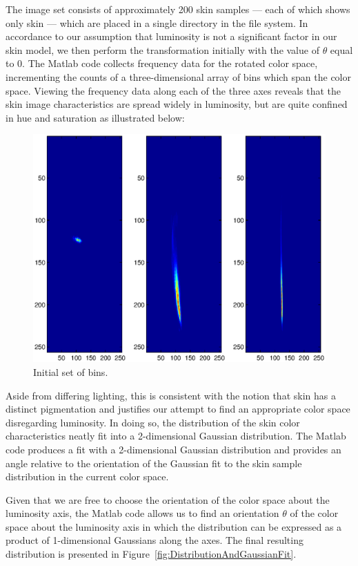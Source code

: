 \documentclass[10pt,a4paper]{article}
\begin{document}
The image set consists of approximately 200 skin samples --- each of which shows only skin --- which are placed in a single directory in the file system. In accordance to our assumption that luminosity is not a significant factor in our skin model, we then perform the transformation initially with the value of $\theta$ equal to 0. The Matlab code collects frequency data for the rotated color space, incrementing the counts of a three-dimensional array of bins which span the color space. Viewing the frequency data along each of the three axes reveals that the skin image characteristics are spread widely in luminosity, but are quite confined in hue and saturation as illustrated below:


\begin{figure}[h!]
  \caption{Initial set of bins.}
  \centering
    \includegraphics[width=\textwidth]{InitialBins.eps}
\end{figure}


Aside from differing lighting, this is consistent with the notion that skin has a distinct pigmentation and justifies our attempt to find an appropriate color space disregarding luminosity. In doing so, the distribution of the skin color characteristics neatly fit into a 2-dimensional Gaussian distribution. The Matlab code produces a fit with a 2-dimensional Gaussian distribution and provides an angle relative to the orientation of the Gaussian fit to the skin sample distribution in the current color space. 

Given that we are free to choose the orientation of the color space about the luminosity axis, the Matlab code allows us to find an orientation $\theta$ of the color space about the luminosity axis in which the distribution can be expressed as a product of 1-dimensional Gaussians along the axes. The final resulting distribution is presented in Figure~\ref{fig:DistributionAndGaussianFit}.
\end{document}
